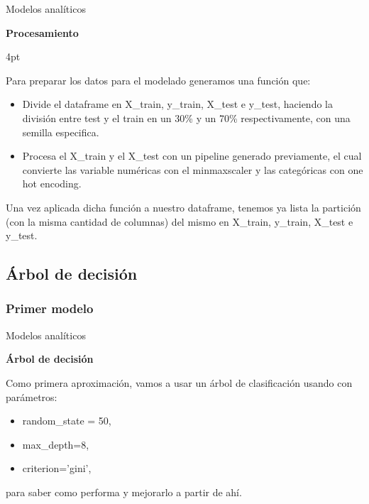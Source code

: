 \documentclass[pdf]{beamer}
\def\vspace{}%
\begin{document}
{\begin{frame}{Modelos analíticos}

    \begin{Large}
        \textbf{Procesamiento}
    \end{Large}
    \vspace{4pt}

    Para preparar los datos para el modelado generamos una función que:
    \begin{itemize}
        \justifying%
        \item  Divide el dataframe en X\_train, y\_train, X\_test e y\_test, haciendo la división entre test y el train en un 30\% y un 70\% respectivamente, con una semilla especifica.
        \item  Procesa el X\_train y el X\_test con un pipeline generado previamente, el cual convierte las variable numéricas con el minmaxscaler y las categóricas con one hot encoding.
    \end{itemize}

    Una vez aplicada dicha función a nuestro dataframe, tenemos ya lista la partición (con la misma cantidad de columnas) del mismo en X\_train, y\_train, X\_test e y\_test.

\end{frame}

    \subsection{Árbol de decisión}

        \subsubsection{Primer modelo}

\begin{frame}{Modelos analíticos}

    \begin{Large}
        \textbf{Árbol de decisión}
    \end{Large}

    Como primera aproximación, vamos a usar un árbol de clasificación usando con parámetros:
    \begin{itemize}
        \item random\_state = 50,
        \item max\_depth=8,
        \item criterion='gini',
    \end{itemize}
    para saber como performa y mejorarlo a partir de ahí.


\end{frame}}
\end{document}
